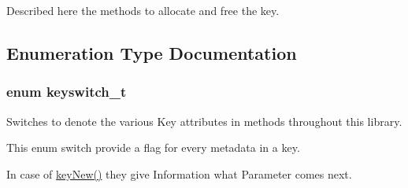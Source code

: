 Described here the methods to allocate and free the key. 

\subsection{Enumeration Type Documentation}
\hypertarget{group__key_ga91fb3178848bd682000958089abbaf40}{
\subsubsection[{keyswitch\_\-t}]{\setlength{\rightskip}{0pt plus 5cm}enum {\bf keyswitch\_\-t}}}
\label{group__key_ga91fb3178848bd682000958089abbaf40}
Switches to denote the various Key attributes in methods throughout this library.

This enum switch provide a flag for every metadata in a key.

In case of \hyperlink{group__key_gaf6893c038b3ebee90c73a9ea8356bebf}{keyNew()} they give Information what Parameter comes next.

